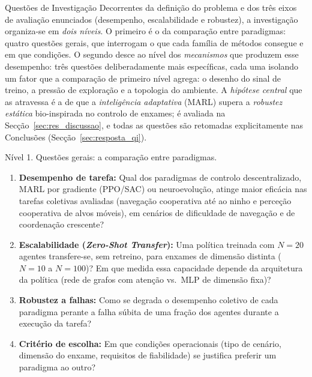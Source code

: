 \documentclass[12pt,reqno, twoside]{amsbook}
\makeatletter
\def\section{\@startsection{section}{1}%
      \z@{.5\linespacing\@plus.7\linespacing}{.25\linespacing}%
      {\normalfont\bfseries\flushleft}}
\def\paragraph{\@startsection{paragraph}{4}%
  \z@\z@{-\fontdimen2\font}%
  {\normalfont\bfseries}}
\theoremstyle{plain}
\numberwithin{equation}{chapter}
\numberwithin{section}{chapter}
\numberwithin{table}{chapter}
\numberwithin{figure}{chapter}
\makeatother
\begin{document}
\section{Questões de Investigação}
\label{sec:questoes_investigacao}
Decorrentes da definição do problema e dos três eixos de avaliação enunciados (desempenho, escalabilidade e robustez), a investigação organiza-se em \emph{dois níveis}. O primeiro é o da comparação entre paradigmas: quatro questões gerais, que interrogam o que cada família de métodos consegue e em que condições. O segundo desce ao nível dos \emph{mecanismos} que produzem esse desempenho: três questões deliberadamente mais específicas, cada uma isolando um fator que a comparação de primeiro nível agrega: o desenho do sinal de treino, a pressão de exploração e a topologia do ambiente. A \emph{hipótese central} que as atravessa é a de que a \emph{inteligência adaptativa} (MARL) supera a \emph{robustez estática} bio-inspirada no controlo de enxames; é avaliada na Secção~\ref{sec:res_discussao}, e todas as questões são retomadas explicitamente nas Conclusões (Secção~\ref{sec:resposta_qi}).

\paragraph{Nível 1. Questões gerais: a comparação entre paradigmas.}
\begin{enumerate}
    \item[\textbf{QI1.}] \textbf{Desempenho de tarefa:} Qual dos paradigmas de controlo descentralizado, MARL por gradiente (PPO/SAC) ou neuroevolução, atinge maior eficácia nas tarefas coletivas avaliadas (navegação cooperativa até ao ninho e perceção cooperativa de alvos móveis), em cenários de dificuldade de navegação e de coordenação crescente?
    \item[\textbf{QI2.}] \textbf{Escalabilidade (\textit{Zero-Shot Transfer}):} Uma política treinada com $N=20$ agentes transfere-se, sem retreino, para enxames de dimensão distinta ($N=10$ a $N=100$)? Em que medida essa capacidade depende da arquitetura da política (rede de grafos com atenção vs.\ MLP de dimensão fixa)?
    \item[\textbf{QI3.}] \textbf{Robustez a falhas:} Como se degrada o desempenho coletivo de cada paradigma perante a falha súbita de uma fração dos agentes durante a execução da tarefa?
    \item[\textbf{QI4.}] \textbf{Critério de escolha:} Em que condições operacionais (tipo de cenário, dimensão do enxame, requisitos de fiabilidade) se justifica preferir um paradigma ao outro?
\end{enumerate}
\end{document}
